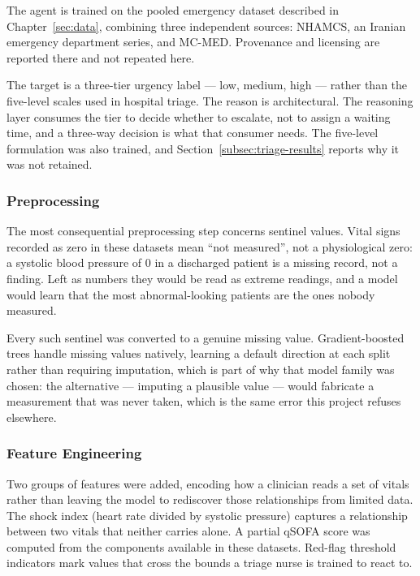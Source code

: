 The agent is trained on the pooled emergency dataset described in Chapter~\ref{sec:data},
combining three independent sources: NHAMCS, an Iranian emergency department series, and
MC-MED. Provenance and licensing are reported there and not repeated here.

The target is a three-tier urgency label --- low, medium, high --- rather than the five-level
scales used in hospital triage. The reason is architectural. The reasoning layer consumes the
tier to decide whether to escalate, not to assign a waiting time, and a three-way decision is
what that consumer needs. The five-level formulation was also trained, and
Section~\ref{subsec:triage-results} reports why it was not retained.

\subsubsection{Preprocessing}

The most consequential preprocessing step concerns sentinel values. Vital signs recorded as
zero in these datasets mean ``not measured'', not a physiological zero: a systolic blood
pressure of 0 in a discharged patient is a missing record, not a finding. Left as numbers they
would be read as extreme readings, and a model would learn that the most abnormal-looking
patients are the ones nobody measured.

Every such sentinel was converted to a genuine missing value. Gradient-boosted trees handle
missing values natively, learning a default direction at each split rather than requiring
imputation, which is part of why that model family was chosen: the alternative --- imputing a
plausible value --- would fabricate a measurement that was never taken, which is the same error
this project refuses elsewhere.

\subsubsection{Feature Engineering}

Two groups of features were added, encoding how a clinician reads a set of vitals rather than
leaving the model to rediscover those relationships from limited data. The shock index (heart
rate divided by systolic pressure) captures a relationship between two vitals that neither
carries alone. A partial qSOFA score was computed from the components available in these
datasets. Red-flag threshold indicators mark values that cross the bounds a triage nurse is
trained to react to.

